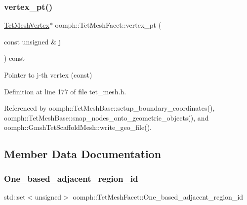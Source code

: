 \mbox{\label{classoomph_1_1TetMeshFacet_a0a745d4bdd17eb45b437d8ef7c8b349a}} 
\subsubsection{\texorpdfstring{vertex\+\_\+pt()}{vertex\_pt()}}
{\footnotesize\ttfamily \hyperlink{classoomph_1_1TetMeshVertex}{Tet\+Mesh\+Vertex}$\ast$ oomph\+::\+Tet\+Mesh\+Facet\+::vertex\+\_\+pt (\begin{DoxyParamCaption}\item[{const unsigned \&}]{j }\end{DoxyParamCaption}) const\hspace{0.3cm}{\ttfamily [inline]}}



Pointer to j-\/th vertex (const) 



Definition at line 177 of file tet\+\_\+mesh.\+h.



Referenced by oomph\+::\+Tet\+Mesh\+Base\+::setup\+\_\+boundary\+\_\+coordinates(), oomph\+::\+Tet\+Mesh\+Base\+::snap\+\_\+nodes\+\_\+onto\+\_\+geometric\+\_\+objects(), and oomph\+::\+Gmsh\+Tet\+Scaffold\+Mesh\+::write\+\_\+geo\+\_\+file().



\subsection{Member Data Documentation}
\mbox{\label{classoomph_1_1TetMeshFacet_a4fda6667fb015320fa128df5b3ce5316}} 
\subsubsection{\texorpdfstring{One\+\_\+based\+\_\+adjacent\+\_\+region\+\_\+id}{One\_based\_adjacent\_region\_id}}
{\footnotesize\ttfamily std\+::set$<$unsigned$>$ oomph\+::\+Tet\+Mesh\+Facet\+::\+One\+\_\+based\+\_\+adjacent\+\_\+region\+\_\+id\hspace{0.3cm}{\ttfamily [private]}}



